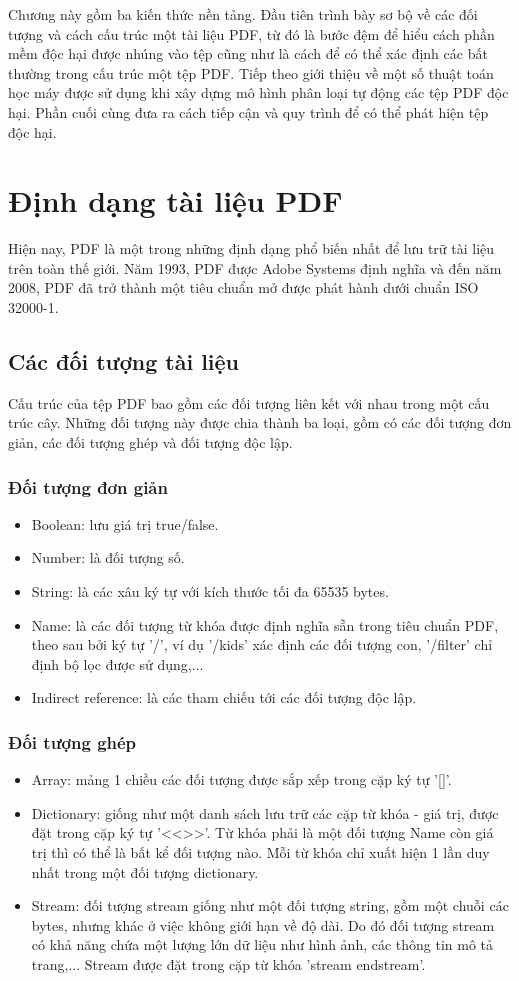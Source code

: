 \documentclass[./../main.tex]{subfiles}
\begin{document}
Chương này gồm ba kiến thức nền tảng. Đầu tiên trình bày sơ bộ về các đối tượng và cách cấu trúc một tài liệu PDF, từ đó là bước đệm để hiểu cách phần mềm độc hại được nhúng vào tệp cũng như là cách để có thể xác định các bất thường trong cấu trúc một tệp PDF. Tiếp theo giới thiệu về một số thuật toán học máy được sử dụng khi xây dựng mô hình phân loại tự động các tệp PDF độc hại. Phần cuối cùng đưa ra cách tiếp cận và quy trình để có thể phát hiện tệp độc hại.

\section{Định dạng tài liệu PDF}
Hiện nay, PDF là một trong những định dạng phổ biến nhất để lưu trữ tài liệu trên toàn thế giới. Năm 1993, PDF được Adobe Systems định nghĩa và đến năm 2008, PDF đã trở thành một tiêu chuẩn mở được phát hành dưới chuẩn ISO 32000-1.

\subsection{Các đối tượng tài liệu}
Cấu trúc của tệp PDF bao gồm các đối tượng liên kết với nhau trong một cấu trúc cây. Những đối tượng này được chia thành ba loại, gồm có các đối tượng đơn giản, các đối tượng ghép và đối tượng độc lập.
\subsubsection*{Đối tượng đơn giản}
\begin{itemize}
	\item Boolean: lưu giá trị true/false.
	\item Number: là đối tượng số.
	\item String: là các xâu ký tự với kích thước tối đa 65535 bytes.
	\item Name: là các đối tượng từ khóa được định nghĩa sẵn trong tiêu chuẩn PDF, theo sau bởi ký tự '/', ví dụ '/kids' xác định các đối tượng con, '/filter' chỉ định bộ lọc được sử dụng,...
	\item Indirect reference: là các tham chiếu tới các đối tượng độc lập.
\end{itemize}
\subsubsection*{Đối tượng ghép}

\begin{itemize}
	\item Array: mảng 1 chiều các đối tượng được sắp xếp trong cặp ký tự '[]'.
	\item Dictionary: giống như một danh sách lưu trữ các cặp từ khóa - giá trị, được đặt trong cặp ký tự  '<<>>'. Từ khóa phải là một đối tượng Name còn giá trị thì có thể là bất kể đối tượng nào. Mỗi từ khóa chỉ xuất hiện 1 lần duy nhất trong một đối tượng dictionary.
	\item Stream: đối tượng stream giống như một đối tượng string, gồm một chuỗi các bytes, nhưng khác ở việc không giới hạn về độ dài. Do đó đối tượng stream có khả năng chứa một lượng lớn dữ liệu như hình ảnh, các thông tin mô tả trang,... Stream được đặt trong cặp từ khóa 'stream endstream'.
\end{itemize}
\end{document}
